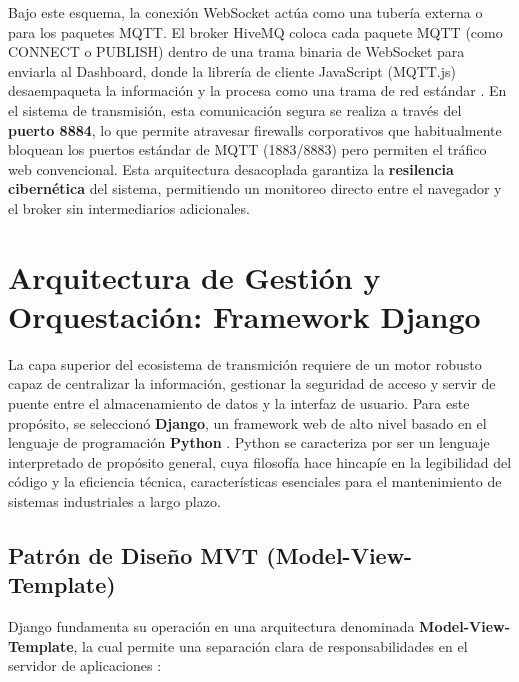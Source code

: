 \par Bajo este esquema, la conexi\'on WebSocket act\'ua como una tuber\'ia externa o  para los paquetes MQTT. El broker HiveMQ coloca cada paquete MQTT (como CONNECT o PUBLISH) dentro de una trama binaria de WebSocket para enviarla al Dashboard, donde la librer\'ia de cliente JavaScript (MQTT.js) desaempaqueta la informaci\'on y la procesa como una trama de red est\'andar \cite{OASIS_MQTT_v5}. En el sistema de transmisi\'on, esta comunicaci\'on segura se realiza a trav\'es del \textbf{puerto 8884}, lo que permite atravesar firewalls corporativos que habitualmente bloquean los puertos est\'andar de MQTT (1883/8883) pero permiten el tr\'afico web convencional. Esta arquitectura desacoplada garantiza la \textbf{resilencia cibern\'etica} del sistema, permitiendo un monitoreo directo entre el navegador y el broker sin intermediarios adicionales.

\section{Arquitectura de Gesti\'on y Orquestaci\'on: Framework Django}

\par La capa superior del ecosistema de transmici\'on requiere de un motor robusto capaz de centralizar la informaci\'on, gestionar la seguridad de acceso y servir de puente entre el almacenamiento de datos y la interfaz de usuario. Para este prop\'osito, se seleccion\'o \textbf{Django}, un framework web de alto nivel basado en el lenguaje de programaci\'on \textbf{Python} \cite{Django_v5_Doc}. Python se caracteriza por ser un lenguaje interpretado de prop\'osito general, cuya filosof\'ia hace hincap\'ie en la legibilidad del c\'odigo y la eficiencia t\'ecnica, caracter\'isticas esenciales para el mantenimiento de sistemas industriales a largo plazo.

\subsection{Patr\'on de Diseño MVT (Model-View-Template)}

\par Django fundamenta su operaci\'on en una arquitectura denominada \textbf{Model-View-Template}, la cual permite una separaci\'on clara de responsabilidades en el servidor de aplicaciones \cite{Django_v5_Doc}:

